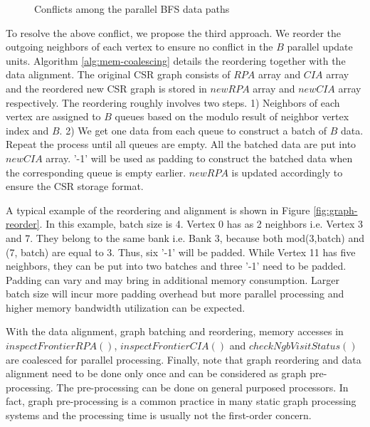 \begin{figure}
    \caption{Conflicts among the parallel BFS data paths}
\label{fig:write-conflict}
\vspace{-1.2em}
\end{figure}

To resolve the above conflict, we propose the third approach. 
We reorder the outgoing neighbors of each 
vertex to ensure no conflict in the $B$ parallel update 
units. Algorithm \ref{alg:mem-coalescing} details the reordering 
together with the data alignment. The original CSR graph consists of
$RPA$ array and $CIA$ array and the reordered new CSR graph is stored 
in $newRPA$ array and $newCIA$ array respectively. The reordering roughly 
involves two steps. 1) Neighbors of each vertex are assigned to 
$B$ queues based on the modulo result of neighbor vertex index and $B$.
2) We get one data from each queue to construct a batch of $B$ data.
Repeat the process until all queues are empty. All the batched data 
are put into $newCIA$ array. '-1' will be used as padding to construct 
the batched data when the corresponding queue is empty earlier. 
$newRPA$ is updated accordingly to ensure the CSR storage format.

A typical example of the reordering and alignment is shown in Figure \ref{fig:graph-reorder}. 
In this example, batch size is 4. Vertex 0 has as 2 neighbors i.e. 
Vertex 3 and 7. They belong to the same bank i.e. Bank 3, because both mod(3,batch) 
and (7, batch) are equal to 3. Thus, six '-1' will be padded. While Vertex 11 
has five neighbors, they can be put into two batches and three '-1' need to 
be padded. Padding can vary and may bring in additional memory consumption. 
Larger batch size will incur more padding overhead but more parallel processing 
and higher memory bandwidth utilization can be expected.

With the data alignment, graph batching and reordering, memory accesses in 
$inspectFrontierRPA()$, $inspectFrontierCIA()$ and $checkNgbVisitStatus()$ 
are coalesced for parallel processing. Finally, note that graph reordering 
and data alignment need to be done only once and can be considered 
as graph pre-processing. The pre-processing can 
be done on general purposed processors. In fact, graph pre-processing is a 
common practice in many static graph processing systems \cite{Dai2017foregraph}
\cite{ham2016graphicionado} \cite{gui2019survey} \cite{shi2018graph} and 
the processing time is usually not the first-order concern.

